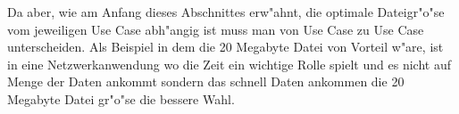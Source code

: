 Da aber, wie am Anfang dieses Abschnittes erw"ahnt, die optimale Dateigr"o"se %
vom jeweiligen Use Case abh"angig ist muss man von Use Case zu Use Case unterscheiden. %
Als Beispiel in dem die 20 Megabyte Datei von Vorteil w"are, ist in eine Netzwerkanwendung %
wo die Zeit ein wichtige Rolle spielt und es nicht auf Menge der Daten ankommt sondern %
das schnell Daten ankommen die 20 Megabyte Datei gr"o"se die bessere Wahl. %

